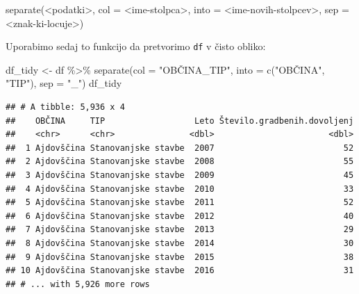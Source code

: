 \documentclass[
]{book}
\newenvironment{Shaded}{\begin{snugshade}}{\end{snugshade}}
\newcommand{\AttributeTok}[1]{\textcolor[rgb]{0.77,0.63,0.00}{#1}}
\newcommand{\FunctionTok}[1]{\textcolor[rgb]{0.00,0.00,0.00}{#1}}
\newcommand{\NormalTok}[1]{#1}
\newcommand{\OtherTok}[1]{\textcolor[rgb]{0.56,0.35,0.01}{#1}}
\newcommand{\SpecialCharTok}[1]{\textcolor[rgb]{0.00,0.00,0.00}{#1}}
\newcommand{\StringTok}[1]{\textcolor[rgb]{0.31,0.60,0.02}{#1}}
\begin{document}
\begin{Shaded}
\begin{Highlighting}[]
\FunctionTok{separate}\NormalTok{(}\SpecialCharTok{\textless{}}\NormalTok{podatki}\SpecialCharTok{\textgreater{}}\NormalTok{, }\AttributeTok{col =} \SpecialCharTok{\textless{}}\NormalTok{ime}\SpecialCharTok{{-}}\NormalTok{stolpca}\SpecialCharTok{\textgreater{}}\NormalTok{, }\AttributeTok{into =} \SpecialCharTok{\textless{}}\NormalTok{ime}\SpecialCharTok{{-}}\NormalTok{novih}\SpecialCharTok{{-}}\NormalTok{stolpcev}\SpecialCharTok{\textgreater{}}\NormalTok{, }\AttributeTok{sep =} \SpecialCharTok{\textless{}}\NormalTok{znak}\SpecialCharTok{{-}}\NormalTok{ki}\SpecialCharTok{{-}}\NormalTok{locuje}\SpecialCharTok{\textgreater{}}\NormalTok{)}
\end{Highlighting}
\end{Shaded}

Uporabimo sedaj to funkcijo da pretvorimo \texttt{df} v čisto obliko:

\begin{Shaded}
\begin{Highlighting}[]
\NormalTok{df\_tidy }\OtherTok{\textless{}{-}}\NormalTok{ df }\SpecialCharTok{\%\textgreater{}\%}
  \FunctionTok{separate}\NormalTok{(}\AttributeTok{col =} \StringTok{"OBČINA\_TIP"}\NormalTok{, }\AttributeTok{into =} \FunctionTok{c}\NormalTok{(}\StringTok{"OBČINA"}\NormalTok{, }\StringTok{"TIP"}\NormalTok{), }\AttributeTok{sep =} \StringTok{"\_"}\NormalTok{)}
\NormalTok{df\_tidy}
\end{Highlighting}
\end{Shaded}

\begin{verbatim}
## # A tibble: 5,936 x 4
##    OBČINA     TIP                  Leto Število.gradbenih.dovoljenj
##    <chr>      <chr>               <dbl>                       <dbl>
##  1 Ajdovščina Stanovanjske stavbe  2007                          52
##  2 Ajdovščina Stanovanjske stavbe  2008                          55
##  3 Ajdovščina Stanovanjske stavbe  2009                          45
##  4 Ajdovščina Stanovanjske stavbe  2010                          33
##  5 Ajdovščina Stanovanjske stavbe  2011                          52
##  6 Ajdovščina Stanovanjske stavbe  2012                          40
##  7 Ajdovščina Stanovanjske stavbe  2013                          29
##  8 Ajdovščina Stanovanjske stavbe  2014                          30
##  9 Ajdovščina Stanovanjske stavbe  2015                          38
## 10 Ajdovščina Stanovanjske stavbe  2016                          31
## # ... with 5,926 more rows
\end{verbatim}
\end{document}
